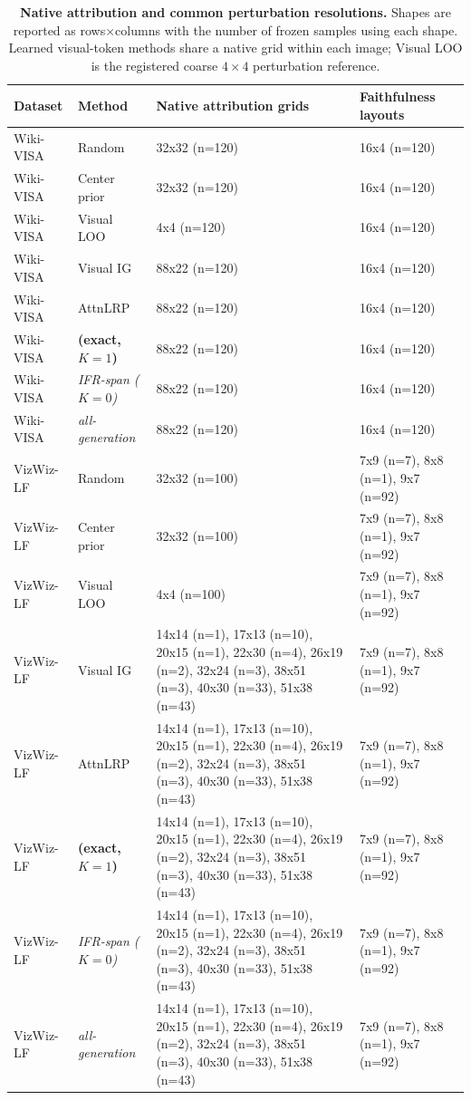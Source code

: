\begin{table}[t]
\centering
\small
\caption{\textbf{Native attribution and common perturbation resolutions.} Shapes are reported as rows$\times$columns with the number of frozen samples using each shape. Learned visual-token methods share a native grid within each image; Visual LOO is the registered coarse $4{\times}4$ perturbation reference.}
\label{tab:visual_spatial_resolution}
\begin{tabular}{ll>{\raggedright\arraybackslash}p{}>{\raggedright\arraybackslash}p{}}
\toprule
\rowcolor{gray!7}
\textbf{Dataset} & \textbf{Method} & \textbf{Native attribution grids} & \textbf{Faithfulness layouts} \\
\midrule
Wiki-VISA & Random & 32x32 (n=120) & 16x4 (n=120) \\
Wiki-VISA & Center prior & 32x32 (n=120) & 16x4 (n=120) \\
Wiki-VISA & Visual LOO & 4x4 (n=120) & 16x4 (n=120) \\
Wiki-VISA & Visual IG & 88x22 (n=120) & 16x4 (n=120) \\
Wiki-VISA & AttnLRP & 88x22 (n=120) & 16x4 (n=120) \\
Wiki-VISA & \textbf{\flashtrace{} (exact, $K{=}1$)} & 88x22 (n=120) & 16x4 (n=120) \\
Wiki-VISA & \textit{IFR-span ($K{=}0$)} & 88x22 (n=120) & 16x4 (n=120) \\
Wiki-VISA & \textit{\flashtrace{} all-generation} & 88x22 (n=120) & 16x4 (n=120) \\
\midrule
VizWiz-LF & Random & 32x32 (n=100) & 7x9 (n=7), 8x8 (n=1), 9x7 (n=92) \\
VizWiz-LF & Center prior & 32x32 (n=100) & 7x9 (n=7), 8x8 (n=1), 9x7 (n=92) \\
VizWiz-LF & Visual LOO & 4x4 (n=100) & 7x9 (n=7), 8x8 (n=1), 9x7 (n=92) \\
VizWiz-LF & Visual IG & 14x14 (n=1), 17x13 (n=10), 20x15 (n=1), 22x30 (n=4), 26x19 (n=2), 32x24 (n=3), 38x51 (n=3), 40x30 (n=33), 51x38 (n=43) & 7x9 (n=7), 8x8 (n=1), 9x7 (n=92) \\
VizWiz-LF & AttnLRP & 14x14 (n=1), 17x13 (n=10), 20x15 (n=1), 22x30 (n=4), 26x19 (n=2), 32x24 (n=3), 38x51 (n=3), 40x30 (n=33), 51x38 (n=43) & 7x9 (n=7), 8x8 (n=1), 9x7 (n=92) \\
VizWiz-LF & \textbf{\flashtrace{} (exact, $K{=}1$)} & 14x14 (n=1), 17x13 (n=10), 20x15 (n=1), 22x30 (n=4), 26x19 (n=2), 32x24 (n=3), 38x51 (n=3), 40x30 (n=33), 51x38 (n=43) & 7x9 (n=7), 8x8 (n=1), 9x7 (n=92) \\
VizWiz-LF & \textit{IFR-span ($K{=}0$)} & 14x14 (n=1), 17x13 (n=10), 20x15 (n=1), 22x30 (n=4), 26x19 (n=2), 32x24 (n=3), 38x51 (n=3), 40x30 (n=33), 51x38 (n=43) & 7x9 (n=7), 8x8 (n=1), 9x7 (n=92) \\
VizWiz-LF & \textit{\flashtrace{} all-generation} & 14x14 (n=1), 17x13 (n=10), 20x15 (n=1), 22x30 (n=4), 26x19 (n=2), 32x24 (n=3), 38x51 (n=3), 40x30 (n=33), 51x38 (n=43) & 7x9 (n=7), 8x8 (n=1), 9x7 (n=92) \\
\bottomrule
\end{tabular}
\end{table}

